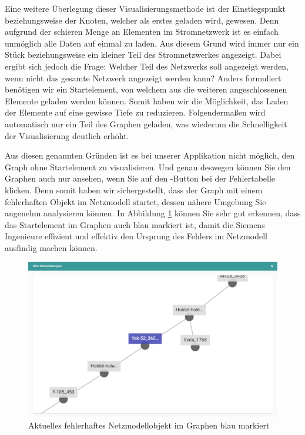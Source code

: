 Eine weitere Überlegung dieser Visualisierungsmethode ist der Einstiegspunkt beziehungsweise der Knoten, welcher als erstes geladen wird, gewesen. Denn aufgrund der schieren Menge an Elementen im Stromnetzwerk ist es einfach unmöglich alle Daten auf einmal zu laden. Aus diesem Grund wird immer nur ein Stück beziehungsweise ein kleiner Teil des Stromnetzwerkes angezeigt. Dabei ergibt sich jedoch die Frage: Welcher Teil des Netzwerks soll angezeigt werden, wenn nicht das gesamte Netzwerk angezeigt werden kann? Anders formuliert benötigen wir ein Startelement, von welchem aus die weiteren angeschlossenen Elemente geladen werden können. Somit haben wir die Möglichkeit, das Laden der Elemente auf eine gewisse Tiefe zu reduzieren. Folgendermaßen wird automatisch nur ein Teil des Graphen geladen, was wiederum die Schnelligkeit der Visualisierung deutlich erhöht.

Aus diesen genannten Gründen ist es bei unserer Applikation nicht möglich, den Graph ohne Startelement zu visualisieren. Und genau deswegen können Sie den Graphen auch nur ansehen, wenn Sie auf den -Button bei der Fehlertabelle klicken. Denn somit haben wir sichergestellt, dass der Graph mit einem fehlerhaften Objekt im Netzmodell startet, dessen nähere Umgebung Sie angenehm analysieren können. In Abbildung \ref{fig:AngularGraphCurrentErrorPrototype} können Sie sehr gut erkennen, dass das Startelement im Graphen auch blau markiert ist, damit die Siemens Ingenieure effizient und effektiv den Ursprung des Fehlers im Netzmodell ausfindig machen können.

\begin{figure}
    \centering
    \includegraphics[width=1\textwidth]{content/img/Empire/Frontend/Angular_Graph_Current_Error_Prototype.png}
    \caption{Aktuelles fehlerhaftes Netzmodellobjekt im Graphen blau markiert}
    \label{fig:AngularGraphCurrentErrorPrototype}
\end{figure}
\FloatBarrier

